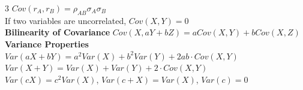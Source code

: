 \documentclass{article}
\begin{document}
{\begin{multicols*}{3}
$Cov(r_A,r_B)=\rho_{AB}\sigma_A\sigma_B$\\
If two variables are uncorrelated, $Cov(X,Y)=0$\\
\textbf{Bilinearity of Covariance} $Cov(X,aY+bZ)=aCov(X,Y)+bCov(X,Z)$\\
\textbf{Variance Properties} $Var(aX+bY)=a^2Var(X)+b^2Var(Y)+2ab\cdot Cov(X,Y)$\\
$Var(X+Y)=Var(X)+Var(Y)+2\cdot Cov(X,Y)$\\
$Var(cX)=c^2Var(X)$, $Var(c+X)=Var(X)$, $Var(c)=0$

\end{multicols*}
}
\end{document}
